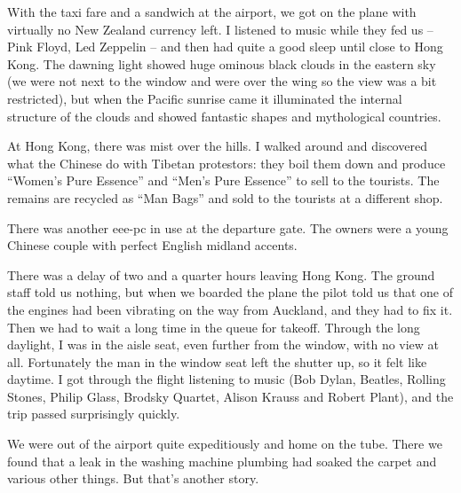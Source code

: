 \documentclass[12pt,a4paper]{article}
\begin{document}
With the taxi fare and a sandwich at the airport, we got on the plane with
virtually no New Zealand currency left. I listened to music while they
fed us -- Pink Floyd, Led Zeppelin -- and then had quite a good sleep
until close to Hong Kong. The dawning light showed huge ominous black clouds
in the eastern sky (we were not next to the window and were over the wing
so the view was a bit restricted), but when the Pacific sunrise came it
illuminated the internal structure of the clouds and showed fantastic
shapes and mythological countries.

At Hong Kong, there was mist over the hills. I walked around and discovered 
what the Chinese do with Tibetan protestors: they boil them down and
produce ``Women's Pure Essence'' and ``Men's Pure Essence'' to sell to the
tourists. The remains are recycled as ``Man Bags'' and sold to the tourists
at a different shop.

There was another eee-pc in use at the departure gate. The owners were a
young Chinese couple with perfect English midland accents.

There was a delay of two and a quarter hours leaving Hong Kong. The ground
staff told us nothing, but when we boarded the plane the pilot told us that
one of the engines had been vibrating on the way from Auckland, and they
had to fix it. Then we had to wait a long time in the queue for takeoff.
Through the long daylight, I was in the aisle seat, even further from the 
window, with no view at all. Fortunately the man in the window seat left
the shutter up, so it felt like daytime. I got through the flight listening
to music (Bob Dylan, Beatles, Rolling Stones, Philip Glass, Brodsky Quartet, 
Alison Krauss and Robert Plant), and the trip passed surprisingly quickly.

We were out of the airport quite expeditiously and home on the tube. There we
found that a leak in the washing machine plumbing had soaked the carpet and
various other things. But that's another story.
\end{document}
